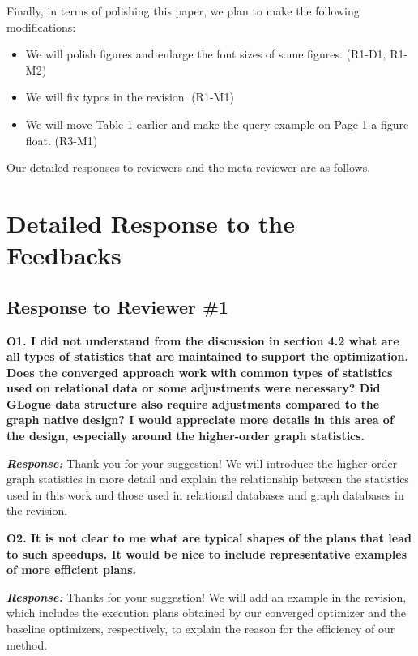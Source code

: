 Finally, in terms of polishing this paper, we plan to make the following modifications:
\begin{itemize}
    \item We will polish figures and enlarge the font sizes of some figures. (R1-D1, R1-M2)
    \item We will fix typos in the revision. (R1-M1)
    \item We will move Table 1 earlier and make the query example on Page 1 a figure float. (R3-M1)
\end{itemize}

Our detailed responses to reviewers and the meta-reviewer are as follows.


\section{Detailed Response to the Feedbacks}
\subsection{Response to Reviewer \#1}

\textbf{O1. I did not understand from the discussion in section 4.2 what are all types of statistics that are maintained to support the optimization. Does the converged approach work with common types of statistics used on relational data or some adjustments were necessary? Did GLogue data structure also require adjustments compared to the graph native design? I would appreciate more details in this area of the design, especially around the higher-order graph statistics.}

\textbf{\textit{Response: }}
Thank you for your suggestion! We will introduce the higher-order graph statistics in more detail and explain the relationship between the statistics used in this work and those used in relational databases and graph databases in the revision.



\textbf{O2. It is not clear to me what are typical shapes of the plans that lead to such speedups. It would be nice to include representative examples of more efficient plans.}

\textbf{\textit{Response: }}
Thanks for your suggestion! We will add an example in the revision, which includes the execution plans obtained by our converged optimizer and the baseline optimizers, respectively, to explain the reason for the efficiency of our method.


